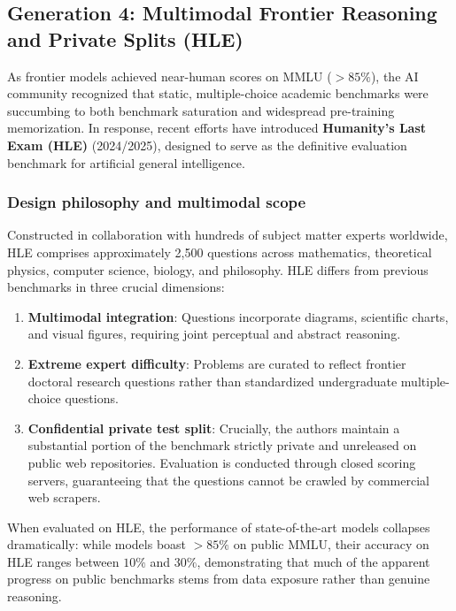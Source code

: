 \documentclass[../../main.tex]{subfiles}
\begin{document}
\subsection{Generation 4: Multimodal Frontier Reasoning and Private Splits (HLE)}
\label{subsec:hle_benchmark}

As frontier models achieved near-human scores on MMLU ($>85\%$), the AI community recognized that static, multiple-choice academic benchmarks were succumbing to both benchmark saturation and widespread pre-training memorization. In response, recent efforts have introduced \textbf{Humanity's Last Exam (HLE)} (2024/2025), designed to serve as the definitive evaluation benchmark for artificial general intelligence.

\subsubsection{Design philosophy and multimodal scope}
Constructed in collaboration with hundreds of subject matter experts worldwide, HLE comprises approximately 2,500 questions across mathematics, theoretical physics, computer science, biology, and philosophy. HLE differs from previous benchmarks in three crucial dimensions:
\begin{enumerate}
    \item \textbf{Multimodal integration}: Questions incorporate diagrams, scientific charts, and visual figures, requiring joint perceptual and abstract reasoning.
    \item \textbf{Extreme expert difficulty}: Problems are curated to reflect frontier doctoral research questions rather than standardized undergraduate multiple-choice questions.
    \item \textbf{Confidential private test split}: Crucially, the authors maintain a substantial portion of the benchmark strictly private and unreleased on public web repositories. Evaluation is conducted through closed scoring servers, guaranteeing that the questions cannot be crawled by commercial web scrapers.
\end{enumerate}

When evaluated on HLE, the performance of state-of-the-art models collapses dramatically: while models boast $>85\%$ on public MMLU, their accuracy on HLE ranges between $10\%$ and $30\%$, demonstrating that much of the apparent progress on public benchmarks stems from data exposure rather than genuine reasoning.
\end{document}
